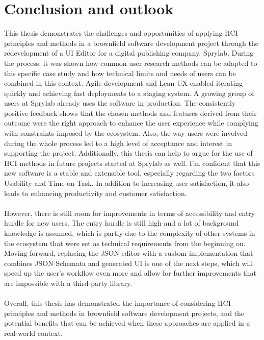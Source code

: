 %
\chapter{Conclusion and outlook}
\label{chap:conclusion}      
This thesis demonstrates the challenges and opportunities of applying HCI principles and methods in a brownfield software development project through the redevelopment of a UI Editor for a digital publishing company, Sprylab.
During the process, it was shown how common user research methods can be adapted to this specific case study and how technical limits and needs of users can be combined in this context.
Agile development and Lean UX enabled iterating quickly and achieving fast deployments to a staging system.
A growing group of users at Sprylab already uses the software in production. The consistently positive feedback shows that the chosen methods and features derived from their outcome were the right approach to enhance the user experience while complying with constraints imposed by the ecosystem.
Also, the way users were involved during the whole process led to a high level of acceptance and interest in supporting the project.
Additionally, this thesis can help to argue for the use of HCI methods in future projects started at Sprylab as well.
I'm confident that this new software is a stable and extensible tool, especially regarding the two factors Usability and Time-on-Task.
In addition to increasing user satisfaction, it also leads to enhancing productivity and customer satisfaction.
\\\\
However, there is still room for improvements in terms of accessibility and entry hurdle for new users.
The entry hurdle is still high and a lot of background knowledge is assumed, which is partly due to the complexity of other systems in the ecosystem that were set as technical requirements from the beginning on.
Moving forward, replacing the JSON editor with a custom implementation that combines JSON Schemata and generated UI is one of the next steps, which will speed up the user's
workflow even more and allow for further improvements that are impossible with a third-party library.
\\\\
Overall, this thesis has demonstrated the importance of considering HCI principles and methods in brownfield software development projects, and the potential benefits that can be achieved when these approaches are applied in a real-world context.